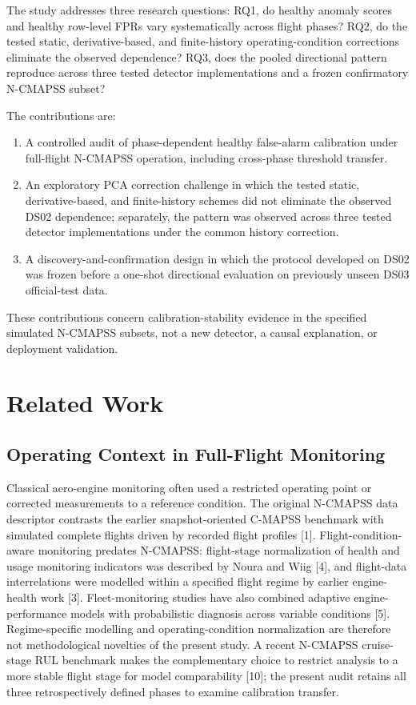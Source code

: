 \documentclass[10pt,conference]{IEEEtran}
\begin{document}
The study addresses three research questions: RQ1, do healthy anomaly scores and healthy row-level FPRs vary systematically across flight phases? RQ2, do the tested static, derivative-based, and finite-history operating-condition corrections eliminate the observed dependence? RQ3, does the pooled directional pattern reproduce across three tested detector implementations and a frozen confirmatory N-CMAPSS subset?

The contributions are:

\begin{enumerate}
\def\labelenumi{\arabic{enumi}.}
\tightlist
\item
  A controlled audit of phase-dependent healthy false-alarm calibration under full-flight N-CMAPSS operation, including cross-phase threshold transfer.
\item
  An exploratory PCA correction challenge in which the tested static, derivative-based, and finite-history schemes did not eliminate the observed DS02 dependence; separately, the pattern was observed across three tested detector implementations under the common history correction.
\item
  A discovery-and-confirmation design in which the protocol developed on DS02 was frozen before a one-shot directional evaluation on previously unseen DS03 official-test data.
\end{enumerate}

These contributions concern calibration-stability evidence in the specified simulated N-CMAPSS subsets, not a new detector, a causal explanation, or deployment validation.

\section{Related Work}\label{related-work}

\subsection{Operating Context in Full-Flight Monitoring}\label{operating-context-in-full-flight-monitoring}

Classical aero-engine monitoring often used a restricted operating point or corrected measurements to a reference condition. The original N-CMAPSS data descriptor contrasts the earlier snapshot-oriented C-MAPSS benchmark with simulated complete flights driven by recorded flight profiles {[}1{]}. Flight-condition-aware monitoring predates N-CMAPSS: flight-stage normalization of health and usage monitoring indicators was described by Noura and Wiig {[}4{]}, and flight-data interrelations were modelled within a specified flight regime by earlier engine-health work {[}3{]}. Fleet-monitoring studies have also combined adaptive engine-performance models with probabilistic diagnosis across variable conditions {[}5{]}. Regime-specific modelling and operating-condition normalization are therefore not methodological novelties of the present study. A recent N-CMAPSS cruise-stage RUL benchmark makes the complementary choice to restrict analysis to a more stable flight stage for model comparability {[}10{]}; the present audit retains all three retrospectively defined phases to examine calibration transfer.
\end{document}
